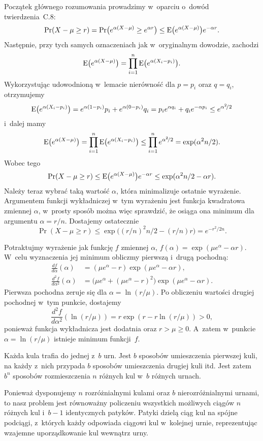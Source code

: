 Początek głównego rozumowania prowadzimy w~oparciu o~dowód twierdzenia~C.8:
\[
	\Pr(X-\mu\ge r) = \Pr\bigl(e^{\alpha(X-\mu)}\ge e^{\alpha r}\bigr) \le \operatorname{E}\bigl(e^{\alpha(X-\mu)}\bigr)e^{-\alpha r}.
\]
Następnie, przy tych samych oznaczeniach jak w~oryginalnym dowodzie, zachodzi
\[
	\operatorname{E}\bigl(e^{\alpha(X-\mu)}\bigr) = \prod_{i=1}^n\operatorname{E}\bigl(e^{\alpha(X_i-p_i)}\bigr).
\]
Wykorzystując udowodnioną w~lemacie nierówność dla $p=p_i$ oraz $q=q_i$, otrzymujemy
\[
	\operatorname{E}\bigl(e^{\alpha(X_i-p_i)}\bigr) = e^{\alpha(1-p_i)}p_i+e^{\alpha(0-p_i)}q_i = p_ie^{\alpha q_i}+q_ie^{-\alpha p_i} \le e^{\alpha^2\!/2}
\]
i~dalej mamy
\[
	\operatorname{E}\bigl(e^{\alpha(X-\mu)}\bigr) = \prod_{i=1}^n\operatorname{E}\bigl(e^{\alpha(X_i-p_i)}\bigr) \le \prod_{i=1}^ne^{\alpha^2\!/2} = \exp(\alpha^2n/2).
\]
Wobec tego
\[
	\Pr(X-\mu\ge r) \le \operatorname{E}\bigl(e^{\alpha(X-\mu)}\bigr)e^{-\alpha r} \le \exp(\alpha^2n/2-\alpha r).
\]
Należy teraz wybrać taką wartość $\alpha$, która minimalizuje ostatnie wyrażenie. Argumentem funkcji wykładniczej w~tym wyrażeniu jest funkcja kwadratowa zmiennej $\alpha$, w~prosty sposób można więc sprawdzić, że osiąga ona minimum dla argumentu $\alpha=r/n$. Dostajemy ostatecznie
\[
	\Pr(X-\mu\ge r) \le \exp\bigl((r/n)^2n/2-(r/n)r\bigr) = e^{-r^2\!/{2n}}.
\]

\exercise %
Potraktujmy wyrażenie jak funkcję $f$ zmiennej $\alpha$, $f(\alpha)=\exp(\mu e^\alpha-\alpha r).$ W~celu wyznaczenia jej minimum obliczmy pierwszą i~drugą pochodną:
\begin{align*}
	\frac{df}{d\alpha}(\alpha) &= (\mu e^\alpha-r)\exp(\mu e^\alpha-\alpha r), \\
	\frac{d^2\!f}{d\alpha^2}(\alpha) &= \bigl(\mu e^\alpha+(\mu e^\alpha-r)^2\bigr)\exp(\mu e^\alpha-\alpha r).
\end{align*}
Pierwsza pochodna zeruje się dla $\alpha=\ln(r/\mu)$. Po obliczeniu wartości drugiej pochodnej w~tym punkcie, dostajemy
\[
	\frac{d^2\!f}{d\alpha^2}(\ln(r/\mu)) = r\exp(r-r\ln(r/\mu)) > 0,
\]
ponieważ funkcja wykładnicza jest dodatnia oraz $r>\mu\ge0$. A~zatem w~punkcie $\alpha=\ln(r/\mu)$ istnieje minimum funkcji~$f$.

\problems


\subproblem %
Każda kula trafia do jednej z~$b$ urn. Jest $b$ sposobów umieszczenia pierwszej kuli, na każdy z~nich przypada $b$ sposobów umieszczenia drugiej kuli itd. Jest zatem $b^n$ sposobów rozmieszczenia $n$ różnych kul w~$b$ różnych urnach.

\subproblem %
Ponieważ dysponujemy $n$ rozróżnialnymi kulami oraz $b$ nierozróżnialnymi urnami, to nasz problem jest równoważny policzeniu wszystkich możliwych ciągów $n$ różnych kul i~$b-1$ identycznych patyków. Patyki dzielą ciąg kul na spójne podciągi, z~których każdy odpowiada ciągowi kul w~kolejnej urnie, reprezentując wzajemne uporządkowanie kul wewnątrz urny.

